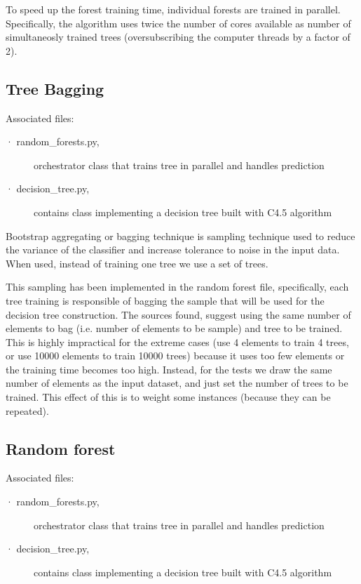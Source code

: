 \documentclass[a4paper,10pt]{article}
\begin{document}
To speed up the forest training time, individual forests are trained in parallel. Specifically, the algorithm uses twice the number of cores available as number of simultaneosly trained trees (oversubscribing the computer threads by a factor of 2).



\subsection{Tree Bagging}

Associated files:
\begin{description}
 \item [· random\_forests.py,] orchestrator class that trains tree in parallel and handles prediction
 \item [· decision\_tree.py,] contains class implementing a decision tree built with C4.5 algorithm
\end{description}

Bootstrap aggregating or bagging technique is sampling technique used to reduce the variance of the classifier and increase tolerance to noise in the input data. When used, instead of training one tree we use a set of trees. 

This sampling has been implemented in the random forest file, specifically, each tree training is responsible of bagging the sample that will be used for the decision tree construction. The sources found, suggest using the same number of elements to bag (i.e. number of elements to be sample) and tree to be trained. This is highly impractical for the extreme cases (use 4 elements to train 4 trees, or use 10000 elements to train 10000 trees) because it uses too few elements or the training time becomes too high. Instead, for the tests we draw the same number of elements as the input dataset, and just set the number of trees to be trained. This effect of this is to weight some instances (because they can be repeated).

\subsection{Random forest}

Associated files:
\begin{description}
 \item [· random\_forests.py,] orchestrator class that trains tree in parallel and handles prediction
 \item [· decision\_tree.py,] contains class implementing a decision tree built with C4.5 algorithm
\end{description}
\end{document}
